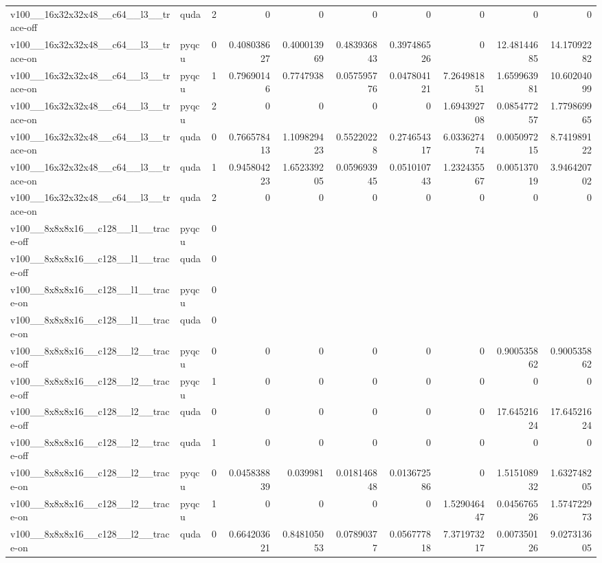 \begin{table}[htbp]
\begin{tabular}{@{}llrrrrrrrr@{}}
v100\_\_16x32x32x48\_\_c64\_\_l3\_\_trace-off & quda & 2 & 0 & 0 & 0 & 0 & 0 & 0 & 0 \\
v100\_\_16x32x32x48\_\_c64\_\_l3\_\_trace-on & pyqcu & 0 & 0.408038627 & 0.400013969 & 0.483936843 & 0.397486526 & 0 & 12.48144685 & 14.17092282 \\
v100\_\_16x32x32x48\_\_c64\_\_l3\_\_trace-on & pyqcu & 1 & 0.79690146 & 0.7747938 & 0.057595776 & 0.047804121 & 7.264981851 & 1.659963981 & 10.60204099 \\
v100\_\_16x32x32x48\_\_c64\_\_l3\_\_trace-on & pyqcu & 2 & 0 & 0 & 0 & 0 & 1.694392708 & 0.085477257 & 1.779869965 \\
v100\_\_16x32x32x48\_\_c64\_\_l3\_\_trace-on & quda & 0 & 0.766578413 & 1.109829423 & 0.55220228 & 0.274654317 & 6.033627474 & 0.005097215 & 8.741989122 \\
v100\_\_16x32x32x48\_\_c64\_\_l3\_\_trace-on & quda & 1 & 0.945804223 & 1.652339205 & 0.059693945 & 0.051010743 & 1.232435567 & 0.005137019 & 3.946420702 \\
v100\_\_16x32x32x48\_\_c64\_\_l3\_\_trace-on & quda & 2 & 0 & 0 & 0 & 0 & 0 & 0 & 0 \\
v100\_\_8x8x8x16\_\_c128\_\_l1\_\_trace-off & pyqcu & 0 &  &  &  &  &  &  &  \\
v100\_\_8x8x8x16\_\_c128\_\_l1\_\_trace-off & quda & 0 &  &  &  &  &  &  &  \\
v100\_\_8x8x8x16\_\_c128\_\_l1\_\_trace-on & pyqcu & 0 &  &  &  &  &  &  &  \\
v100\_\_8x8x8x16\_\_c128\_\_l1\_\_trace-on & quda & 0 &  &  &  &  &  &  &  \\
v100\_\_8x8x8x16\_\_c128\_\_l2\_\_trace-off & pyqcu & 0 & 0 & 0 & 0 & 0 & 0 & 0.900535862 & 0.900535862 \\
v100\_\_8x8x8x16\_\_c128\_\_l2\_\_trace-off & pyqcu & 1 & 0 & 0 & 0 & 0 & 0 & 0 & 0 \\
v100\_\_8x8x8x16\_\_c128\_\_l2\_\_trace-off & quda & 0 & 0 & 0 & 0 & 0 & 0 & 17.64521624 & 17.64521624 \\
v100\_\_8x8x8x16\_\_c128\_\_l2\_\_trace-off & quda & 1 & 0 & 0 & 0 & 0 & 0 & 0 & 0 \\
v100\_\_8x8x8x16\_\_c128\_\_l2\_\_trace-on & pyqcu & 0 & 0.045838839 & 0.039981 & 0.018146848 & 0.013672586 & 0 & 1.515108932 & 1.632748205 \\
v100\_\_8x8x8x16\_\_c128\_\_l2\_\_trace-on & pyqcu & 1 & 0 & 0 & 0 & 0 & 1.529046447 & 0.045676526 & 1.574722973 \\
v100\_\_8x8x8x16\_\_c128\_\_l2\_\_trace-on & quda & 0 & 0.664203621 & 0.848105053 & 0.07890377 & 0.056777818 & 7.371973217 & 0.007350126 & 9.027313605 \\

\end{tabular}
\end{table}
